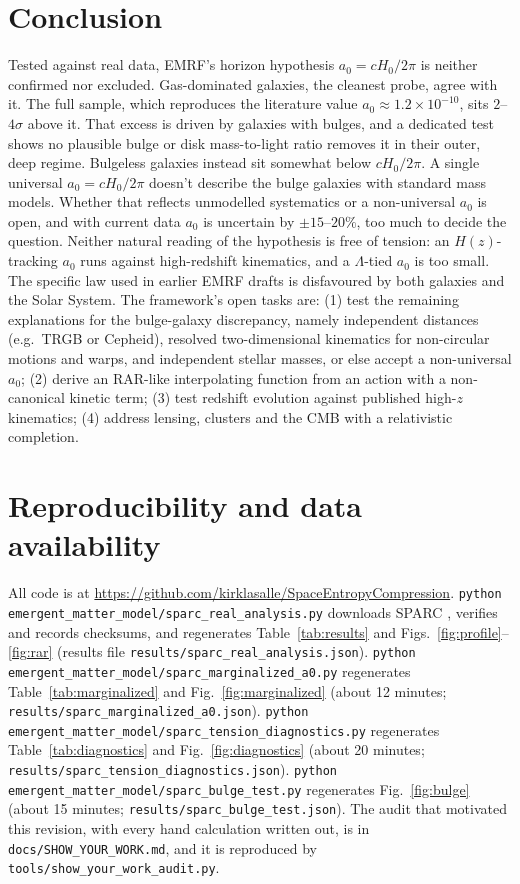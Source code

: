 \documentclass[11pt,a4paper]{article}
\begin{document}
\section{Conclusion}
\label{sec:conclusion}
Tested against real data, EMRF's horizon hypothesis $a_0 = cH_0/2\pi$ is neither confirmed nor excluded. Gas-dominated galaxies, the cleanest probe, agree with it. The full sample, which reproduces the literature value $a_0 \approx 1.2\times10^{-10}$, sits $2$--$4\sigma$ above it. That excess is driven by galaxies with bulges, and a dedicated test shows no plausible bulge or disk mass-to-light ratio removes it in their outer, deep regime. Bulgeless galaxies instead sit somewhat below $cH_0/2\pi$. A single universal $a_0 = cH_0/2\pi$ doesn't describe the bulge galaxies with standard mass models. Whether that reflects unmodelled systematics or a non-universal $a_0$ is open, and with current data $a_0$ is uncertain by $\pm15$--$20\%$, too much to decide the question. Neither natural reading of the hypothesis is free of tension: an $H(z)$-tracking $a_0$ runs against high-redshift kinematics, and a $\Lambda$-tied $a_0$ is too small. The specific law used in earlier EMRF drafts is disfavoured by both galaxies and the Solar System. The framework's open tasks are:
(1) test the remaining explanations for the bulge-galaxy discrepancy, namely independent distances (e.g.\ TRGB or Cepheid), resolved two-dimensional kinematics for non-circular motions and warps, and independent stellar masses, or else accept a non-universal $a_0$;
(2) derive an RAR-like interpolating function from an action with a non-canonical kinetic term;
(3) test redshift evolution against published high-$z$ kinematics;
(4) address lensing, clusters and the CMB with a relativistic completion.

\section*{Reproducibility and data availability}
\label{sec:repro}
All code is at \url{https://github.com/kirklasalle/SpaceEntropyCompression}. \texttt{python emergent\_matter\_model/sparc\_real\_analysis.py} downloads SPARC \cite{lelli2016sparc}, verifies and records checksums, and regenerates Table~\ref{tab:results} and Figs.~\ref{fig:profile}--\ref{fig:rar} (results file \texttt{results/sparc\_real\_analysis.json}). \texttt{python emergent\_matter\_model/sparc\_marginalized\_a0.py} regenerates Table~\ref{tab:marginalized} and Fig.~\ref{fig:marginalized} (about 12 minutes; \texttt{results/sparc\_marginalized\_a0.json}). \texttt{python emergent\_matter\_model/sparc\_tension\_diagnostics.py} regenerates Table~\ref{tab:diagnostics} and Fig.~\ref{fig:diagnostics} (about 20 minutes; \texttt{results/sparc\_tension\_diagnostics.json}). \texttt{python emergent\_matter\_model/sparc\_bulge\_test.py} regenerates Fig.~\ref{fig:bulge} (about 15 minutes; \texttt{results/sparc\_bulge\_test.json}). The audit that motivated this revision, with every hand calculation written out, is in \texttt{docs/SHOW\_YOUR\_WORK.md}, and it is reproduced by \texttt{tools/show\_your\_work\_audit.py}.
\end{document}

